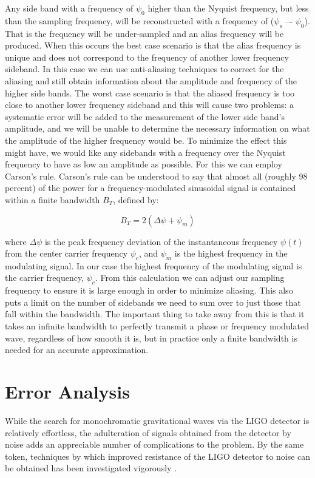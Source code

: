 \documentclass[onecolumn, groupedaddress, 10pt]{revtex4-1}
\begin{document}
Any side band with a frequency of $\psi_0$ higher than the Nyquist frequency, but less than the sampling frequency, will be reconstructed with a frequency of ($\psi_s$ –- $\psi_0$). That is the frequency will be under-sampled and an alias frequency will be produced. When this occurs the best case scenario is that the alias frequency is unique and does not correspond to the frequency of another lower frequency sideband. In this case we can use anti-aliasing techniques to correct for the aliasing and still obtain information about the amplitude and frequency of the higher side bands. The worst case scenario is that the aliased frequency is too close to another lower frequency sideband and this will cause two problems: a systematic error will be added to the measurement of the lower side band’s amplitude, and we will be unable to determine the necessary information on what the amplitude of the higher frequency would be. To minimize the effect this might have, we would like any sidebands with a frequency over the Nyquist frequency to have as low an amplitude as possible. For this we can employ Carson’s rule. Carson’s rule can be understood to say that almost all (roughly 98 percent) of the power for a frequency-modulated sinusoidal signal is contained within a finite bandwidth $B_T$, defined by:

\begin{equation}
B_T = 2(\Delta\psi + \psi_m)
\end{equation}

where $\Delta\psi$ is the peak frequency deviation of the instantaneous frequency $\psi(t)$ from the center carrier frequency $\psi_c$, and $\psi_m$ is the highest frequency in the modulating signal. In our case the highest frequency of the modulating signal is the carrier frequency, $\psi_c$. From this calculation we can adjust our sampling frequency to ensure it is large enough in order to minimize aliasing. This also puts a limit on the number  of sidebands we need to sum over to just those that fall within the bandwidth.  The important thing to take away from this is that it takes an infinite bandwidth to perfectly transmit a phase or frequency modulated wave, regardless of how smooth it is, but in practice only a finite bandwidth is needed for an accurate approximation.
 

\section{Error Analysis}
While the search for monochromatic gravitational waves via the LIGO detector is relatively effortless, the adulteration of signals obtained from the detector by noise adds an appreciable number of complications to the problem. By the same token, techniques by which improved resistance of the LIGO detector to noise can be obtained has been investigated vigorously \citep{abramovici1996improved} \citep{aasi2013enhanced}.
\end{document}
